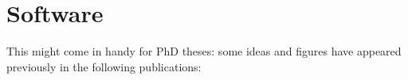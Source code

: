 \chapter*{Software}
This might come in handy for PhD theses: some ideas and figures have appeared previously in the following publications:

\begin{refsection}[ownsoft]
    \small
    \nocite{*} %
    \printbibliography[heading=none]
\end{refsection}
